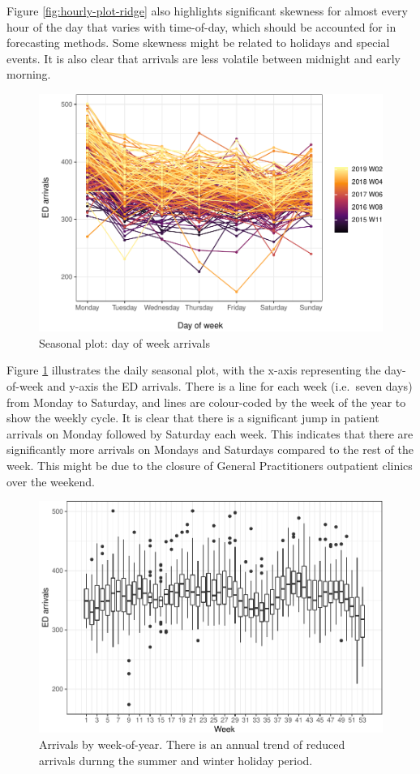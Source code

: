 \documentclass[]{elsarticle} %
\begin{document}
Figure \ref{fig:hourly-plot-ridge} also highlights significant skewness for almost every hour of the day that varies with time-of-day, which should be accounted for in forecasting methods. Some skewness might be related to holidays and special events. It is also clear that arrivals are less volatile between midnight and early morning.

\begin{figure}[H]
 
 {\centering \includegraphics[width=0.7\linewidth]{paper_files/figure-latex/seasonplot-dofw-1} 
 
 }
 
 \caption{Seasonal plot: day of week arrivals}\label{fig:seasonplot-dofw}
 \end{figure}

Figure \ref{fig:seasonplot-dofw} illustrates the daily seasonal plot, with the x-axis representing the day-of-week and y-axis the ED arrivals. There is a line for each week (i.e.~seven days) from Monday to Saturday, and lines are colour-coded by the week of the year to show the weekly cycle. It is clear that there is a significant jump in patient arrivals on Monday followed by Saturday each week. This indicates that there are significantly more arrivals on Mondays and Saturdays compared to the rest of the week. This might be due to the closure of General Practitioners outpatient clinics over the weekend.

\begin{figure}[H]

{\centering \includegraphics[width=0.7\linewidth]{paper_files/figure-latex/seasonplot-weekofyear-1} 

}

\caption{Arrivals by week-of-year. There is an annual trend of reduced arrivals durnng the summer and winter holiday period.}\label{fig:seasonplot-weekofyear}
\end{figure}
\end{document}
